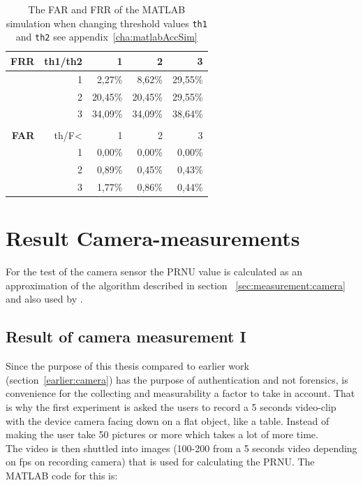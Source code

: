 \begin{table}[htbp]
  \centering
    \begin{tabular}{rrrrr}
    \toprule
    \textbf{FRR} & th1/th2 & 1     & 2     & 3 \\
    \midrule
          & 1     & 2,27\% & 8,62\% & 29,55\% \\
          & 2     & 20,45\% & 20,45\% & 29,55\% \\
          & 3     & 34,09\% & 34,09\% & 38,64\% \\
          &       &       &       &  \\
    \textbf{FAR} & th/F< & 1     & 2     & 3 \\
          & 1     & 0,00\% & 0,00\% & 0,00\% \\
          & 2     & 0,89\% & 0,45\% & 0,43\% \\
          & 3     & 1,77\% & 0,86\% & 0,44\% \\
    \bottomrule
    \end{tabular}%
    \caption{The FAR and FRR of the MATLAB simulation when changing threshold values \texttt{th1} and \texttt{th2} see appendix~\ref{cha:matlabAccSim}}
  \label{tab:farfrr}%
\end{table}%


\section{Result Camera-measurements}\label{sec:ResCam}
For the test of the camera sensor the PRNU value is calculated as an approximation of the algorithm described in section ~\ref{sec:measurement:camera} and also used by \cite{sensor:camera:DCIdent}. 

\subsection{Result of camera measurement I}
Since the purpose of this thesis compared to earlier work (section~\ref{earlier:camera}) has the purpose of authentication and not forensics, is convenience for the collecting and measurability a factor to take in account. That is why the first experiment is asked the users to record a 5 seconds video-clip with the device camera facing down on a flat object, like a table. Instead of making the user take 50 pictures or more which takes a lot of more time. \\
The video is then shuttled into images (100-200 from a 5 seconds video depending on fps on recording camera) that is used for calculating the PRNU. The MATLAB code for this is:\\



